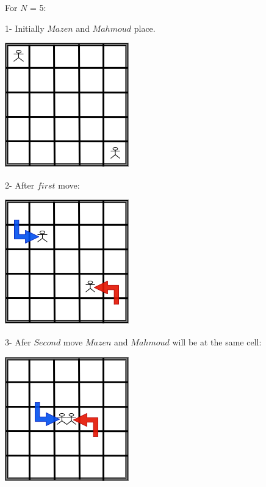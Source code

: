 For $N$ = 5:

1- Initially $Mazen$ and $Mahmoud$ place.
\begin{center}
  \includegraphics[scale=1.5]{Initialyf.drawio.png} \\
  \small{}
\end{center}

2- After $first$ move$:$
\begin{center}
  \includegraphics[scale=1.5]{First_Move.drawio.png} \\
  \small{}
\end{center}

3- Afer $Second$ move $Mazen$ and $Mahmoud$ will be at the same cell:
\begin{center}
  \includegraphics[scale=1.5]{Second_Move.drawio.png} \\
  \small{}
\end{center}
